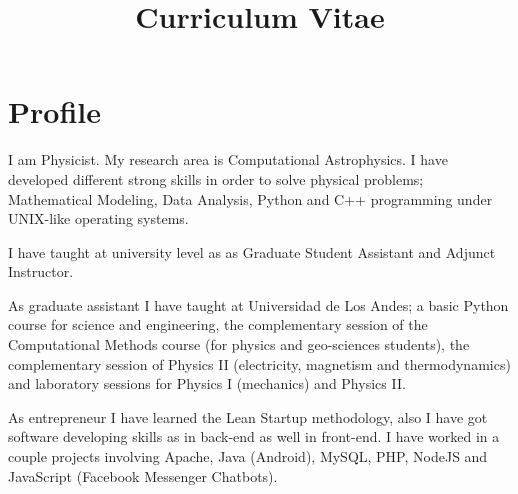 \documentclass[12pt,letterpaper,sans]{moderncv}
\title{Curriculum Vitae}
\newcommand{\forceindent}{\leavevmode{\parindent=1em\indent}}
\begin{document}
%
%
%
%





\makecvtitle %



\section{Profile}

I am Physicist. My research area is Computational Astrophysics. I have developed different 
strong skills in order to solve physical problems; Mathematical Modeling, Data Analysis, 
Python and C++ programming under UNIX-like operating systems. 
\par
\forceindent I have taught at university level as as Graduate Student 
Assistant and Adjunct Instructor.

As graduate assistant I have taught at Universidad de Los Andes; a basic Python course for
science and engineering, the complementary session of the Computational Methods course (for
physics and geo-sciences students), the complementary session of Physics II (electricity,
magnetism and thermodynamics) and laboratory sessions for Physics I (mechanics) and Physics II. 

\forceindent As entrepreneur I have learned the
Lean Startup methodology, also I have got software developing skills as in back-end as 
well in front-end. I have worked in a couple projects involving Apache, Java (Android),
MySQL, PHP, NodeJS and JavaScript (Facebook Messenger Chatbots).
\par
\end{document}
